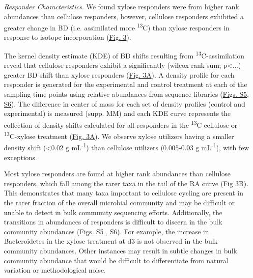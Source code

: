 \textit{Responder Characteristics}.  We found xylose responders were from higher rank abundances than cellulose responders, however, cellulose responders exhibited a greater change in BD (i.e. assimilated more \textsuperscript{13}C) than xylose responders in response to isotope incorporation (\href{https://authorea.com/users/3537/articles/3612/master/file/figures/shift_and_rabund2/shift_and_rabund2.png}{Fig. 3}). 

The kernel density estimate (KDE) of BD shifts resulting from \textsuperscript{13}C-assimilation reveal that cellulose responders exhibit a significantly (wilcox rank sum; p\textless...) greater BD shift than xylose responders (\href{https://authorea.com/users/3537/articles/3612/master/file/figures/shift_and_rabund2/shift_and_rabund2.png}{Fig. 3A}). A density profile for each responder is generated for the experimental and control treatment at each of the sampling time points using relative abundances from sequence libraries (\href{https://authorea.com/users/3537/articles/8459/master/file/figures/xylose_resp_profiles/xylose_resp_profiles.png}{Figs. S5}\href{https://authorea.com/users/3537/articles/8459/master/file/figures/cellulose_resp_profiles/cellulose_resp_profiles.png}{, S6}). The difference in center of mass for each set of density profiles (control and experimental) is measured (supp. MM) and each KDE curve represents the collection of density shifts calculated for all responders in the \textsuperscript{13}C-cellulose or \textsuperscript{13}C-xylose treatment (\href{https://authorea.com/users/3537/articles/3612/master/file/figures/shift_and_rabund2/shift_and_rabund2.png}{Fig. 3A}). We observe xylose utilizers having a smaller density shift (\textless0.02 g mL\textsuperscript{-1}) than cellulose utilizers (0.005-0.03 g mL\textsuperscript{-1}), with few exceptions. 

Most xylose responders are found at higher rank abundances than cellulose responders, which fall among the rarer taxa in the tail of the RA curve (Fig 3B). This demonstrates that many taxa important to cellulose cycling are present in the rarer fraction of the overall microbial community and may be difficult or unable to detect in bulk community sequencing efforts. Additionally, the transitions in abundances of responders is difficult to discern in the bulk community abundances (\href{https://authorea.com/users/3537/articles/8459/master/file/figures/xylose_resp_profiles/xylose_resp_profiles.png}{Figs. S5} \href{https://authorea.com/users/3537/articles/8459/master/file/figures/cellulose_resp_profiles/cellulose_resp_profiles.png}{, S6}). For example, the increase in Bacteroidetes in the xylose treatment at d3 is not observed in the bulk community abundances. Other instances may result in subtle changes in bulk community abundance that would be difficult to differentiate from natural variation or methodological noise.



